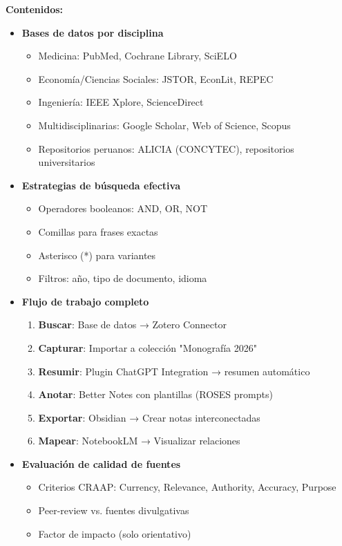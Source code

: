 \documentclass[12pt,a4paper]{yaac-luatex}
\begin{document}
\begin{tcolorbox}[
		enhanced,
		colback=white,
		colframe=curso3color,
		arc=3pt,
		boxrule=1.5pt,
		left=10pt,
		right=10pt,
		top=8pt,
		bottom=8pt,
		breakable
		]
		\textbf{Contenidos:}
		\begin{itemize}[leftmargin=*, itemsep=0.1cm]
			\item \textbf{Bases de datos por disciplina}
			\begin{itemize}
				\item Medicina: PubMed, Cochrane Library, SciELO
				\item Economía/Ciencias Sociales: JSTOR, EconLit, REPEC
				\item Ingeniería: IEEE Xplore, ScienceDirect
				\item Multidisciplinarias: Google Scholar, Web of Science, Scopus
				\item Repositorios peruanos: ALICIA (CONCYTEC), repositorios universitarios
			\end{itemize}
			\item \textbf{Estrategias de búsqueda efectiva}
			\begin{itemize}
				\item Operadores booleanos: AND, OR, NOT
				\item Comillas para frases exactas
				\item Asterisco (*) para variantes
				\item Filtros: año, tipo de documento, idioma
			\end{itemize}
			\item \textbf{Flujo de trabajo completo}
			\begin{enumerate}[leftmargin=*, itemsep=0.1cm]
				\item \textbf{Buscar}: Base de datos → Zotero Connector
				\item \textbf{Capturar}: Importar a colección "Monografía 2026"
				\item \textbf{Resumir}: Plugin ChatGPT Integration → resumen automático
				\item \textbf{Anotar}: Better Notes con plantillas (ROSES prompts)
				\item \textbf{Exportar}: Obsidian → Crear notas interconectadas
				\item \textbf{Mapear}: NotebookLM → Visualizar relaciones
			\end{enumerate}
			\item \textbf{Evaluación de calidad de fuentes}
			\begin{itemize}
				\item Criterios CRAAP: Currency, Relevance, Authority, Accuracy, Purpose
				\item Peer-review vs. fuentes divulgativas
				\item Factor de impacto (solo orientativo)
			\end{itemize}
		\end{itemize}
		

\end{tcolorbox}
\end{document}
